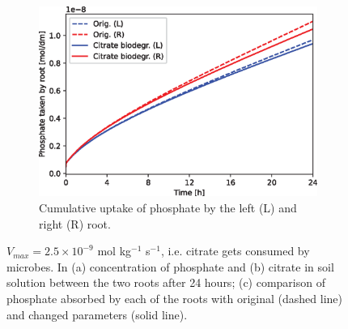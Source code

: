 \documentclass[11pt]{article}
\numberwithin{equation}{section}
\begin{document}
\begin{figure}[!htb]
\begin{subfigure}[t]{0.45\textwidth}
    \includegraphics[width=\textwidth]{Figures/citratevmaxnonzero.eps}
    \caption{Cumulative uptake of phosphate by the left (L) and right (R) root.}
    \label{fig:numexp_vmax2}
\end{subfigure}
\caption{$V_{max} = 2.5 \times 10^{-9}$ mol kg$^{-1}$ s$^{-1}$, i.e. citrate gets consumed by microbes. In (a) concentration of phosphate and (b) citrate in soil solution between the two roots after 24 hours; (c) comparison of phosphate absorbed by each of the roots with original (dashed line) and changed parameters (solid line).}
\end{figure}

\end{document}
